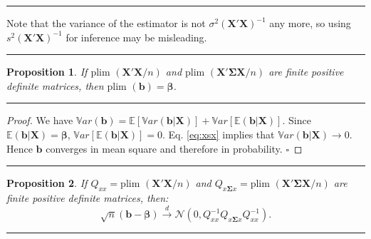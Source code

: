 \documentclass[
]{book}
\newtheorem{proposition}{Proposition}[chapter]
\theoremstyle{definition}
\theoremstyle{definition}
\theoremstyle{definition}
\theoremstyle{definition}
\theoremstyle{remark}
\begin{document}
\begin{center}\rule{0.5\linewidth}{0.5pt}\end{center}

Note that the variance of the estimator is not \(\sigma^2 (\mathbf{X}'\mathbf{X})^{-1}\) any more, so using \(s^2 (\mathbf{X}'\mathbf{X})^{-1}\) for inference may be misleading.

\begin{center}\rule{0.5\linewidth}{0.5pt}\end{center}

\begin{proposition}
\protect\hypertarget{prp:XXX}{}\label{prp:XXX}If \(\mbox{plim }(\mathbf{X}'\mathbf{X}/n)\) and \(\mbox{plim }(\mathbf{X}'\boldsymbol\Sigma\mathbf{X}/n)\) are finite positive definite matrices, then \(\mbox{plim }(\mathbf{b})=\boldsymbol\beta\).
\end{proposition}

\begin{center}\rule{0.5\linewidth}{0.5pt}\end{center}

\begin{proof}
We have \(\mathbb{V}ar(\mathbf{b})=\mathbb{E}[\mathbb{V}ar(\mathbf{b}|\mathbf{X})]+\mathbb{V}ar[\mathbb{E}(\mathbf{b}|\mathbf{X})]\). Since \(\mathbb{E}(\mathbf{b}|\mathbf{X})=\boldsymbol\beta\), \(\mathbb{V}ar[\mathbb{E}(\mathbf{b}|\mathbf{X})]=0\). Eq. \eqref{eq:xsx} implies that \(\mathbb{V}ar(\mathbf{b}|\mathbf{X}) \rightarrow 0\). Hence \(\mathbf{b}\) converges in mean square and therefore in probability. \(\square\)
\end{proof}

\begin{center}\rule{0.5\linewidth}{0.5pt}\end{center}

\begin{proposition}
\protect\hypertarget{prp:AsymptGRM}{}\label{prp:AsymptGRM}If \(Q_{xx}=\mbox{plim }(\mathbf{X}'\mathbf{X}/n)\) and \(Q_{x\boldsymbol\Sigma x}=\mbox{plim }(\mathbf{X}'\boldsymbol\Sigma\mathbf{X}/n)\) are finite positive definite matrices, then:
\[
\sqrt{n}(\mathbf{b}-\boldsymbol\beta) \overset{d}{\rightarrow} \mathcal{N}(0,Q_{xx}^{-1}Q_{x\boldsymbol\Sigma x}Q_{xx}^{-1}).
\]
\end{proposition}

\begin{center}\rule{0.5\linewidth}{0.5pt}\end{center}
\end{document}
